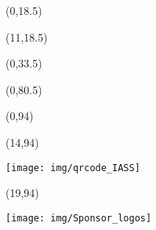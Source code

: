 \documentclass[20pt]{beamer}
\begin{document}
    \begin{frame}

        \begin{textblock}{10.5}(0,18.5)
            
        \end{textblock}

        \begin{textblock}{19}(11,18.5)
            
        \end{textblock}

        \begin{textblock}{30}(0,33.5)
            
        \end{textblock}

        \begin{textblock}{30}(0,80.5)
            
        \end{textblock}

        \begin{textblock}{14}(0,94)
            \begin{WhiteBox}
                \vspace{-1cm}
                \begin{block}{}
                    
                    
                \end{block}
            \end{WhiteBox}
        \end{textblock}

        \begin{textblock}{5}(14,94)
            \begin{ClearBox}
                \begin{block}{}
                    \centering
                    \texttt{[image: img/qrcode\_IASS]}
                \end{block}
            \end{ClearBox}
        \end{textblock}

        \begin{textblock}{11}(19,94)
            \begin{WhiteBox}
                \vspace{-1cm}
                \begin{block}{}
                    \texttt{[image: img/Sponsor\_logos]}
                \end{block}
            \end{WhiteBox}
        \end{textblock}
    \end{frame}
\end{document}

